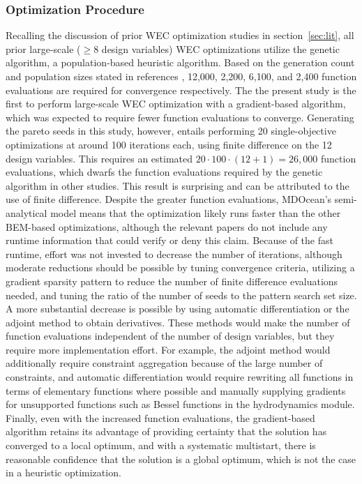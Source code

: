 \subsubsection{Optimization Procedure}
\label{sec:discussion-optimization}
Recalling the discussion of prior WEC optimization studies in section~\ref{sec:lit}, all prior large-scale ($\geq8$ design variables) WEC optimizations utilize the genetic algorithm, a population-based heuristic algorithm.
Based on the generation count and population sizes stated in references \cite{khanal_multi-objective_2024,garcia-teruel_reliability-based_2021,cotten_multi-objective_2022,abdulkadir_control_2024}, 12,000, 2,200, 6,100, and 2,400 function evaluations are required for convergence respectively.
The the present study is the first to perform large-scale WEC optimization with a gradient-based algorithm, which was expected to require fewer function evaluations to converge.
Generating the pareto seeds in this study, however, entails performing 20 single-objective optimizations at around 100 iterations each, using finite difference on the 12 design variables.
This requires an estimated $20\cdot100\cdot(12+1)=26,000$ function evaluations, which dwarfs the function evaluations required by the genetic algorithm in other studies.
This result is surprising and can be attributed to the use of finite difference.
Despite the greater function evaluations, MDOcean's semi-analytical model means that the optimization likely runs faster than the other BEM-based optimizations, although the relevant papers do not include any runtime information that could verify or deny this claim.
Because of the fast runtime, effort was not invested to decrease the number of iterations, although moderate reductions should be possible by tuning convergence criteria, utilizing a gradient sparsity pattern to reduce the number of finite difference evaluations needed, and tuning the ratio of the number of seeds to the pattern search set size.
A more substantial decrease is possible by using automatic differentiation or the adjoint method to obtain derivatives.
These methods would make the number of function evaluations independent of the number of design variables, but they require more implementation effort.
For example, the adjoint method would additionally require constraint aggregation because of the large number of constraints, and automatic differentiation would require rewriting all functions in terms of elementary functions where possible and manually supplying gradients for unsupported functions such as Bessel functions in the hydrodynamics module.
Finally, even with the increased function evaluations, the gradient-based algorithm retains its advantage of providing certainty that the solution has converged to a local optimum, and with a systematic multistart, there is reasonable confidence that the solution is a global optimum, which is not the case in a heuristic optimization.


